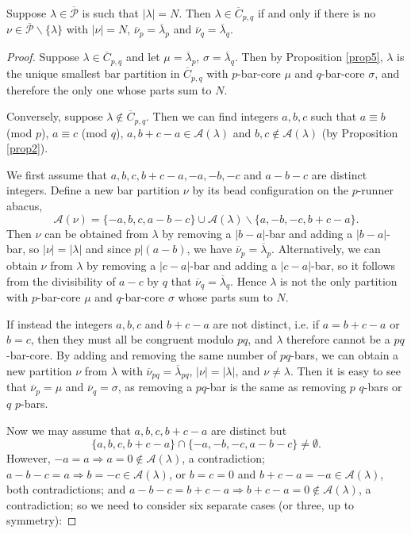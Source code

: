 \documentclass[ALCO, Unicode,published]{cedram}
\begin{document}
\begin{coro}\label{cor4}
Suppose $\lambda\in\overline{\mathcal{P}}$ is such that $|\lambda|=N$. Then $\lambda\in\overline{C}_{p,q}$ if and only if there is no $\nu\in\overline{\mathcal{P}}\backslash\{\lambda\}$ with $|\nu|=N$, $\overline{\nu}_p=\overline{\lambda}_p$ and $\overline{\nu}_q=\overline{\lambda}_q$. 
\end{coro}
\begin{proof}
Suppose $\lambda\in\overline{C}_{p,q}$ and let $\mu=\overline{\lambda}_p$, $\sigma=\overline{\lambda}_q$. Then by Proposition \ref{prop5}, $\lambda$ is the unique smallest bar partition in $\overline{C}_{p,q}$ with $p$-bar-core $\mu$ and $q$-bar-core $\sigma$, and therefore the only one whose parts sum to $N$. 

Conversely, suppose $\lambda\not\in\overline{C}_{p,q}$. Then we can find integers $a,b,c$ such that $a\equiv b$ (mod $p$), $a\equiv c$ (mod $q$), $a,b+c-a\in\mathcal{A}(\lambda)$ and $b,c\not\in\mathcal{A}(\lambda)$ (by Proposition \ref{prop2}). 

We first assume that $a,b,c,b+c-a,-a,-b,-c$ and $a-b-c$ are distinct integers. Define a new bar partition $\nu$ by its bead configuration on the $p$-runner abacus, 
$$\mathcal{A}(\nu)=\{-a,b,c,a-b-c\}\cup\mathcal{A}(\lambda)\backslash\{a,-b,-c,b+c-a\}.$$ 
Then $\nu$ can be obtained from $\lambda$ by removing a $|b-a|$-bar and adding a $|b-a|$-bar, so $|\nu|=|\lambda|$ and since $p|(a-b)$, we have $\overline{\nu}_p=\overline{\lambda}_p$. Alternatively, we can obtain $\nu$ from $\lambda$ by removing a $|c-a|$-bar and adding a $|c-a|$-bar, so it follows from the divisibility of $a-c$ by $q$ that $\overline{\nu}_q=\overline{\lambda}_q$. Hence $\lambda$ is not the only partition with $p$-bar-core $\mu$ and $q$-bar-core $\sigma$ whose parts sum to $N$. 

If instead the integers $a,b,c$ and $b+c-a$ are not distinct, i.e. if $a=b+c-a$ or $b=c$, then they must all be congruent modulo $pq$, and $\lambda$ therefore cannot be a $pq$-bar-core. 
By adding and removing the same number of $pq$-bars, we can obtain a new partition $\nu$ from $\lambda$ with $\overline{\nu}_{pq}=\overline{\lambda}_{pq}$, $|\nu|=|\lambda|$, and $\nu\neq\lambda$. Then it is easy to see that $\overline{\nu}_p=\mu$ and $\overline{\nu}_q=\sigma$, as removing a $pq$-bar is the same as removing $p$ $q$-bars or $q$ $p$-bars. 

Now we may assume that $a,b,c,b+c-a$ are distinct but $$\{a,b,c,b+c-a\}\cap\{-a,-b,-c,a-b-c\}\neq\emptyset.$$ 
However, 
$-a=a\Rightarrow a=0\not\in\mathcal{A}(\lambda)$, a contradiction; \newline
$a-b-c=a\Rightarrow b=-c\in\mathcal{A}(\lambda)$, or $b=c=0$ and $b+c-a=-a\in\mathcal{A}(\lambda)$, both contradictions; \newline
and $a-b-c=b+c-a\Rightarrow  b+c-a=0\not\in\mathcal{A}(\lambda)$, a contradiction; \newline
so we need to consider six separate cases (or three, up to symmetry): 


\end{proof}
\end{document}

